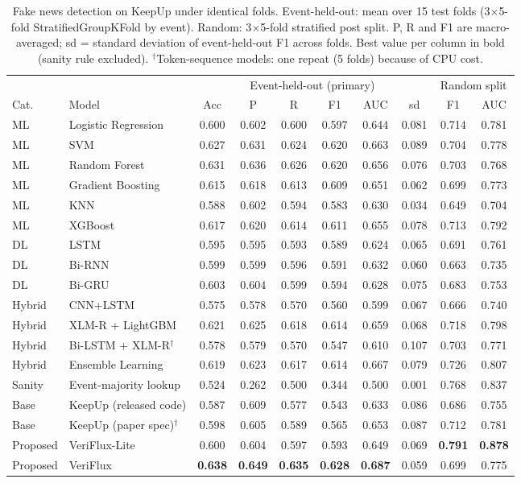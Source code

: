 \begin{table}[t]
\centering
\caption{Fake news detection on KeepUp under identical folds. Event-held-out: mean over 15 test folds
(3$\times$5-fold StratifiedGroupKFold by event). Random: 3$\times$5-fold stratified post split.
P, R and F1 are macro-averaged; sd = standard deviation of event-held-out F1 across folds. Best value per
column in bold (sanity rule excluded). $^\dagger$Token-sequence models: one repeat (5 folds) because of CPU cost.}
\label{tab:main}
\footnotesize
\begin{tabular}{llcccccc|cc}
\toprule
 & & \multicolumn{6}{c|}{Event-held-out (primary)} & \multicolumn{2}{c}{Random split}\\
Cat. & Model & Acc & P & R & F1 & AUC & sd & F1 & AUC\\
\midrule
ML & Logistic Regression & 0.600 & 0.602 & 0.600 & 0.597 & 0.644 & 0.081 & 0.714 & 0.781\\
ML & SVM & 0.627 & 0.631 & 0.624 & 0.620 & 0.663 & 0.089 & 0.704 & 0.778\\
ML & Random Forest & 0.631 & 0.636 & 0.626 & 0.620 & 0.656 & 0.076 & 0.703 & 0.768\\
ML & Gradient Boosting & 0.615 & 0.618 & 0.613 & 0.609 & 0.651 & 0.062 & 0.699 & 0.773\\
ML & KNN & 0.588 & 0.602 & 0.594 & 0.583 & 0.630 & 0.034 & 0.649 & 0.704\\
ML & XGBoost & 0.617 & 0.620 & 0.614 & 0.611 & 0.655 & 0.078 & 0.713 & 0.792\\
\midrule
DL & LSTM & 0.595 & 0.595 & 0.593 & 0.589 & 0.624 & 0.065 & 0.691 & 0.761\\
DL & Bi-RNN & 0.599 & 0.599 & 0.596 & 0.591 & 0.632 & 0.060 & 0.663 & 0.735\\
DL & Bi-GRU & 0.603 & 0.604 & 0.599 & 0.594 & 0.628 & 0.075 & 0.683 & 0.753\\
\midrule
Hybrid & CNN+LSTM & 0.575 & 0.578 & 0.570 & 0.560 & 0.599 & 0.067 & 0.666 & 0.740\\
Hybrid & XLM-R + LightGBM & 0.621 & 0.625 & 0.618 & 0.614 & 0.659 & 0.068 & 0.718 & 0.798\\
Hybrid & Bi-LSTM + XLM-R$^\dagger$ & 0.578 & 0.579 & 0.570 & 0.547 & 0.610 & 0.107 & 0.703 & 0.771\\
Hybrid & Ensemble Learning & 0.619 & 0.623 & 0.617 & 0.614 & 0.667 & 0.079 & 0.726 & 0.807\\
\midrule
Sanity & Event-majority lookup & 0.524 & 0.262 & 0.500 & 0.344 & 0.500 & 0.001 & 0.768 & 0.837\\
\midrule
Base & KeepUp (released code) & 0.587 & 0.609 & 0.577 & 0.543 & 0.633 & 0.086 & 0.686 & 0.755\\
Base & KeepUp (paper spec)$^\dagger$ & 0.598 & 0.605 & 0.589 & 0.565 & 0.653 & 0.087 & 0.712 & 0.781\\
\midrule
Proposed & VeriFlux-Lite & 0.600 & 0.604 & 0.597 & 0.593 & 0.649 & 0.069 & \textbf{0.791} & \textbf{0.878}\\
Proposed & VeriFlux & \textbf{0.638} & \textbf{0.649} & \textbf{0.635} & \textbf{0.628} & \textbf{0.687} & 0.059 & 0.699 & 0.775\\
\bottomrule
\end{tabular}
\end{table}
